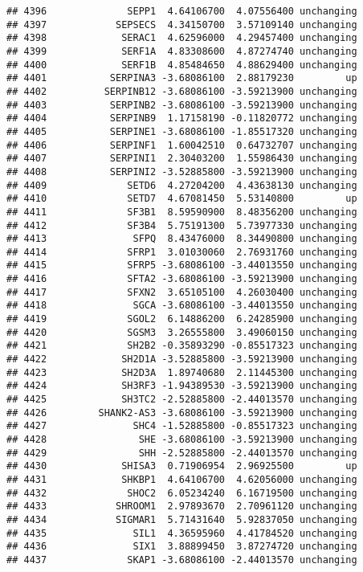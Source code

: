 \documentclass[]{article}
\begin{document}
\begin{verbatim}
## 4396              SEPP1  4.64106700  4.07556400 unchanging
## 4397            SEPSECS  4.34150700  3.57109140 unchanging
## 4398             SERAC1  4.62596000  4.29457400 unchanging
## 4399             SERF1A  4.83308600  4.87274740 unchanging
## 4400             SERF1B  4.85484650  4.88629400 unchanging
## 4401           SERPINA3 -3.68086100  2.88179230         up
## 4402          SERPINB12 -3.68086100 -3.59213900 unchanging
## 4403           SERPINB2 -3.68086100 -3.59213900 unchanging
## 4404           SERPINB9  1.17158190 -0.11820772 unchanging
## 4405           SERPINE1 -3.68086100 -1.85517320 unchanging
## 4406           SERPINF1  1.60042510  0.64732707 unchanging
## 4407           SERPINI1  2.30403200  1.55986430 unchanging
## 4408           SERPINI2 -3.52885800 -3.59213900 unchanging
## 4409              SETD6  4.27204200  4.43638130 unchanging
## 4410              SETD7  4.67081450  5.53140800         up
## 4411              SF3B1  8.59590900  8.48356200 unchanging
## 4412              SF3B4  5.75191300  5.73977330 unchanging
## 4413               SFPQ  8.43476000  8.34490800 unchanging
## 4414              SFRP1  3.01030060  2.76931760 unchanging
## 4415              SFRP5 -3.68086100 -3.44013550 unchanging
## 4416              SFTA2 -3.68086100 -3.59213900 unchanging
## 4417              SFXN2  3.65105100  4.26030400 unchanging
## 4418               SGCA -3.68086100 -3.44013550 unchanging
## 4419              SGOL2  6.14886200  6.24285900 unchanging
## 4420              SGSM3  3.26555800  3.49060150 unchanging
## 4421              SH2B2 -0.35893290 -0.85517323 unchanging
## 4422             SH2D1A -3.52885800 -3.59213900 unchanging
## 4423             SH2D3A  1.89740680  2.11445300 unchanging
## 4424             SH3RF3 -1.94389530 -3.59213900 unchanging
## 4425             SH3TC2 -2.52885800 -2.44013570 unchanging
## 4426         SHANK2-AS3 -3.68086100 -3.59213900 unchanging
## 4427               SHC4 -1.52885800 -0.85517323 unchanging
## 4428                SHE -3.68086100 -3.59213900 unchanging
## 4429                SHH -2.52885800 -2.44013570 unchanging
## 4430             SHISA3  0.71906954  2.96925500         up
## 4431             SHKBP1  4.64106700  4.62056000 unchanging
## 4432              SHOC2  6.05234240  6.16719500 unchanging
## 4433            SHROOM1  2.97893670  2.70961120 unchanging
## 4434            SIGMAR1  5.71431640  5.92837050 unchanging
## 4435               SIL1  4.36595960  4.41784520 unchanging
## 4436               SIX1  3.88899450  3.87274720 unchanging
## 4437              SKAP1 -3.68086100 -2.44013570 unchanging

\end{verbatim}
\end{document}
